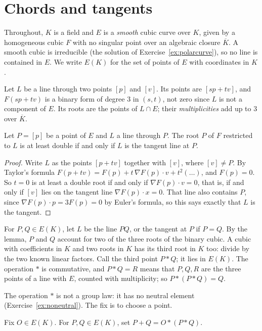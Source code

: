 \section{Chords and tangents}

Throughout, $K$ is a field and $E$ is a \emph{smooth} cubic curve over $K$, given by a homogeneous cubic $F$ with no singular point over an algebraic
closure $\overline K$. A smooth cubic is irreducible (the solution of Exercise~\ref{ex:polarcurve}), so no line is contained in $E$. We write $E(K)$ for the
set of points of $E$ with coordinates in $K$.

Let $L$ be a line through two points $[p]$ and $[v]$. Its points are $[sp+tv]$, and $F(sp+tv)$ is a binary form of degree $3$ in $(s,t)$, not zero since $L$ is
not a component of $E$. Its roots are the points of $L\cap E$; their \emph{multiplicities} add up to $3$ over $\overline K$.

\begin{lemma}\label{lem:tangentdouble}
Let $P=[p]$ be a point of $E$ and $L$ a line through $P$. The root $P$ of $F$ restricted to $L$ is at least double if and only if $L$ is the tangent line
at $P$.
\end{lemma}

\begin{proof}
Write $L$ as the points $[p+tv]$ together with $[v]$, where $[v]\ne P$. By Taylor's formula $F(p+tv)=F(p)+t\,\nabla F(p)\cdot v+t^2(\dots)$, and $F(p)=0$.
So $t=0$ is at least a double root if and only if $\nabla F(p)\cdot v=0$, that is, if and only if $[v]$ lies on the tangent line $\nabla F(p)\cdot x=0$.
That line also contains $P$, since $\nabla F(p)\cdot p=3F(p)=0$ by Euler's formula, so this says exactly that $L$ is the tangent.
\end{proof}

For $P,Q\in E(K)$, let $L$ be the line $PQ$, or the tangent at $P$ if $P=Q$. By the lemma, $P$ and $Q$ account for two of the three roots of the binary cubic.
A cubic with coefficients in $K$ and two roots in $K$ has its third root in $K$ too: divide by the two known linear factors. Call the third point $P*Q$; it
lies in $E(K)$. The operation $*$ is commutative, and $P*Q=R$ means that $P,Q,R$ are the three points of a line with $E$, counted with multiplicity; so
$P*(P*Q)=Q$.

The operation $*$ is not a group law: it has no neutral element (Exercise~\ref{ex:noneutral}). The fix is to choose a point.

\begin{definition}
Fix $O\in E(K)$. For $P,Q\in E(K)$, set $P+Q=O*(P*Q)$.
\end{definition}

